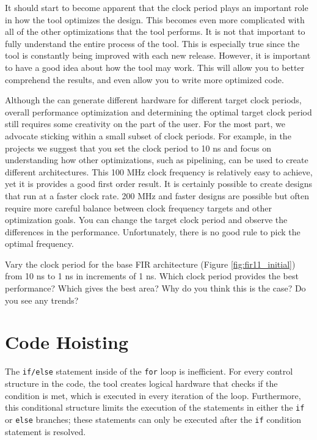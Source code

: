 It should start to become apparent that the clock period plays an important role in how the \VHLS tool optimizes the design. This becomes even more complicated with all of the other optimizations that the \VHLS tool performs. It is not that important to fully understand the entire process of the \VHLS tool. This is especially true since the tool is constantly being improved with each new release. However, it is important to have a good idea about how the tool may work. This will allow you to better comprehend the results, and even allow you to write more optimized code. 

Although the \VHLS can generate different hardware for different target clock periods, overall performance optimization and determining the optimal target clock period still requires some creativity on the part of the user. For the most part, we advocate sticking within a small subset of clock periods. For example, in the projects we suggest that you set the clock period to 10 ns and focus on understanding how other optimizations, such as pipelining, can be used to create different architectures. This 100 MHz clock frequency is relatively easy to achieve, yet it is provides a good first order result. It is certainly possible to create designs that run at a faster clock rate.  200 MHz and faster designs are possible but often require more careful balance between clock frequency targets and other optimization goals.  You can change the target clock period and observe the differences in the performance. Unfortunately, there is no good rule to pick the optimal frequency. 

\begin{exercise}
Vary the clock period for the base FIR architecture (Figure \ref{fig:fir11_initial}) from 10 ns to 1 ns in increments of 1 ns. Which clock period provides the best performance? Which gives the best area? Why do you think this is the case? Do you see any trends? 
\end{exercise}

\section{Code Hoisting}

The \lstinline{if/else} statement inside of the \lstinline{for} loop is inefficient.  For every control structure in the code, the \VHLS tool creates logical hardware that checks if the condition is met, which is executed in every iteration of the loop. Furthermore, this conditional structure limits the execution of the statements in either the \lstinline{if} or \lstinline{else} branches; these statements can only be executed after the \lstinline{if} condition statement is resolved.


